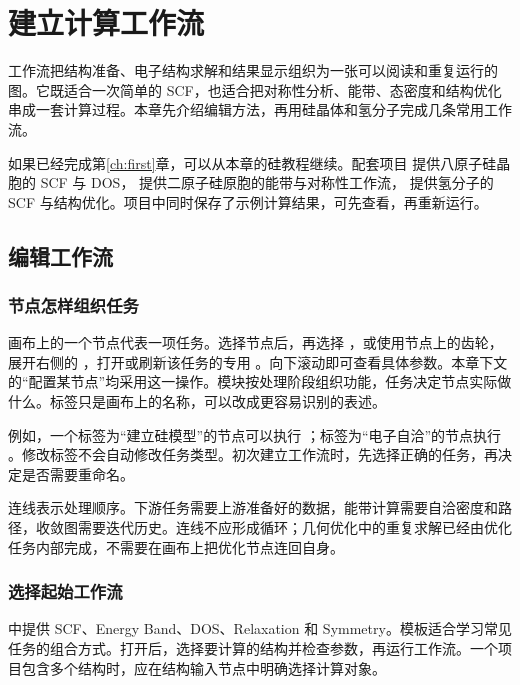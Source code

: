 \chapter{建立计算工作流}\label{ch:workflows}

工作流把结构准备、电子结构求解和结果显示组织为一张可以阅读和重复运行的图。它既适合一次简单的 SCF，也适合把对称性分析、能带、态密度和结构优化串成一套计算过程。本章先介绍编辑方法，再用硅晶体和氢分子完成几条常用工作流。

如果已经完成第\ref{ch:first}章，可以从本章的硅教程继续。配套项目  提供八原子硅晶胞的 SCF 与 DOS， 提供二原子硅原胞的能带与对称性工作流， 提供氢分子的 SCF 与结构优化。项目中同时保存了示例计算结果，可先查看，再重新运行。

\section{编辑工作流}

\subsection{节点怎样组织任务}

画布上的一个节点代表一项任务。选择节点后，再选择 ，或使用节点上的齿轮，展开右侧的 ，打开或刷新该任务的专用 。向下滚动即可查看具体参数。本章下文的“配置某节点”均采用这一操作。模块按处理阶段组织功能，任务决定节点实际做什么。标签只是画布上的名称，可以改成更容易识别的表述。

例如，一个标签为“建立硅模型”的节点可以执行 ；标签为“电子自洽”的节点执行 。修改标签不会自动修改任务类型。初次建立工作流时，先选择正确的任务，再决定是否需要重命名。

连线表示处理顺序。下游任务需要上游准备好的数据，能带计算需要自洽密度和路径，收敛图需要迭代历史。连线不应形成循环；几何优化中的重复求解已经由优化任务内部完成，不需要在画布上把优化节点连回自身。

\subsection{选择起始工作流}

 中提供 SCF、Energy Band、DOS、Relaxation 和 Symmetry。模板适合学习常见任务的组合方式。打开后，选择要计算的结构并检查参数，再运行工作流。一个项目包含多个结构时，应在结构输入节点中明确选择计算对象。

